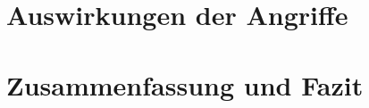 \documentclass[	a4paper,
			11pt,
			titlepage,
			oneside,
			fleqn,
			listof=totoc,
			parskip,
			chapterprefix=false,
			numbers=noenddot]{scrreprt}
\begin{document}
	
	\clearpage
	\section*{Auswirkungen der Angriffe}
	
	
	
	\clearpage
	\section*{Zusammenfassung und Fazit}
\end{document}
